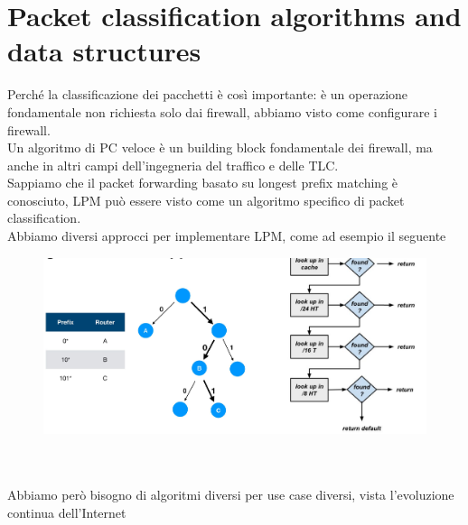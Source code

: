\documentclass[12pt, oneside]{extbook} %
\begin{document}
\section{Packet classification algorithms and data structures}
Perché la classificazione dei pacchetti è così importante: è un operazione fondamentale non richiesta solo dai firewall, abbiamo visto come configurare i firewall.
\\Un algoritmo di PC veloce è un building block fondamentale dei firewall, ma anche in altri campi dell'ingegneria del traffico e delle TLC.
\\Sappiamo che il packet forwarding basato su longest prefix matching è conosciuto, LPM può essere visto come un algoritmo specifico di packet classification.
\\Abbiamo diversi approcci per implementare LPM, come ad esempio il seguente\\
\begin{figure}[h!]
    \centering
    \includegraphics[scale=0.45]{../../immagini/lpm_ex}
\end{figure}\\\\
Abbiamo però bisogno di algoritmi diversi per use case diversi, vista l'evoluzione continua dell'Internet
\end{document}
